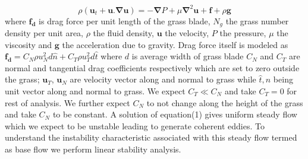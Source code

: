 \documentclass[aps,twocolumn,floatfix,prl,10pt]{revtex4-1}
\newcommand{\bu}{\mathbf{u}}
\newcommand{\grad}{\mathbf{\nabla}}
\newcommand{\del}{\partial}
\begin{document}
\begin{equation}
\rho \left(\bu_{t}+\bu.\grad\bu \right) = -\grad P+\mu\grad^{2}\bu +\mathbf{f}+\rho\mathbf{g}
\end{equation}
where $\mathbf{f_{d}}$ is drag force per unit length of the grass blade, $N_g$ the grass number density per unit area, $\rho$ the fluid density, $\mathbf{u}$ the velocity, 
$P$ the pressure, $\mu$ the viscosity and $\mathbf{g}$ the acceleration due to gravity. Drag force itself is modeled 
as $\mathbf{f_{d}}=C_N \rho u_{N}^{2}d\hat{n}+C_{T}\rho u_{T}^{2}d\hat{t}$ where $d$ is average width of grass blade 
$C_{N}$ and $C_{T}$ are normal and tangential drag coefficients respectively which are set to zero outside the grass; $\bu_{T}$, $\bu_{N}$ are velocity vector along and
normal to grass while $\hat{t},\hat{n}$ being unit vector along and normal to grass. We expect $C_T \ll C_N$ and take $C_T=0$ for rest of analysis. We further expect $C_N$ to
not change along the height of the grass and take $C_N$ to be constant. 
\newline
A solution of equation(1) gives uniform steady flow which we expect to be unstable leading to generate coherent eddies. To understand the instability characteristic associated with this
steady flow termed as base flow we perform linear stability analysis.  
\end{document}
